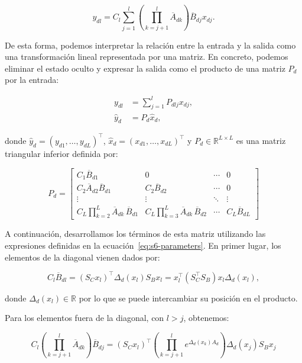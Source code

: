 \[
y_{dl} = C_l\sum_{j=1}^{l}\left(\prod_{k=j+1}^{l}\overline{A}_{dk}\right)\overline{B}_{dj}x_{dj}.
\]

De esta forma, podemos interpretar la relación entre la entrada y la salida como una transformación 
lineal representada por una matriz. En concreto, podemos eliminar el estado oculto y expresar la salida 
como el producto de una matriz $P_d$ por la entrada:

\begin{equation}
\label{eq:discrete-limit}
\begin{aligned}
y_{dl} &= \sum_{j=1}^{l}P_{dlj}x_{dj},\\
\hat{y}_d &= P_d\hat{x}_d,
\end{aligned}
\end{equation}

donde $\hat{y}_d=(y_{d1},\ldots,y_{dL})^\top$, $\hat{x}_d=(x_{d1},\ldots,x_{dL})^\top$ y $P_d\in\mathbb{R}^{L\times L}$ 
es una matriz triangular inferior definida por:

\begin{equation}
\label{eq:p-matrix}
P_d =
\begin{bmatrix}
C_1\overline{B}_{d1} & 0 & \cdots & 0 \\
C_2\overline{A}_{d2}\overline{B}_{d1} & C_2\overline{B}_{d2} & \cdots & 0 \\
\vdots & \vdots & \ddots & \vdots \\
C_L\displaystyle\prod_{k=2}^{L}\overline{A}_{dk}\,\overline{B}_{d1} & 
C_L\displaystyle\prod_{k=3}^{L}\overline{A}_{dk}\,\overline{B}_{d2} & 
\cdots & C_L\overline{B}_{dL}
\end{bmatrix}
\end{equation} 

A continuación, desarrollamos los términos de esta matriz utilizando las expresiones definidas en la 
ecuación~\ref{eq:s6-parameters}. En primer lugar, los elementos de la diagonal vienen dados por:

\[
C_l\overline{B}_{dl} = (S_Cx_l)^\top \Delta_d(x_l)S_Bx_l =  x_l^\top (S_C^\top S_B)x_l \Delta_d(x_l),
\]

donde $\Delta_d(x_l)\in\mathbb{R}$ por lo que se puede intercambiar su posición en el producto.

Para los elementos fuera de la diagonal, con $l>j$, obtenemos:

\[
C_l\left(\prod_{k=j+1}^{l}\overline{A}_{dk}\right)\overline{B}_{dj} = 
(S_Cx_l)^\top \left(\prod_{k=j+1}^{l}e^{\Delta_d(x_k)A_d}\right) \Delta_d(x_j)S_Bx_j
\]

